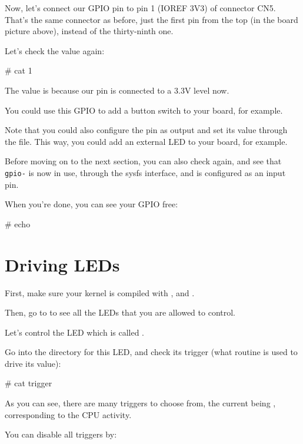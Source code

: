 {Now, let's connect our GPIO pin to pin 1 (IOREF 3V3) of connector CN5.
That's the same connector as before, just the first pin from the top
(in the board picture above), instead of the thirty-ninth one.

Let's check the value again:

\begin{bashinput}
# cat %
1
\end{bashinput}

The value is  because our pin is connected to a 3.3V level now.

You could use this GPIO to add a button switch to your board, for
example.

Note that you could also configure the pin as output and set its value
through the  file. This way, you could add an external LED
to your board, for example.

Before moving on to the next section, you can also check
 again, and see that {\tt gpio-\gpionum} is now
in use, through the sysfs interface, and is configured as an input pin.

When you're done, you can see your GPIO free:

\begin{bashinput}
# echo %
\end{bashinput}

\section{Driving LEDs}

First, make sure your kernel is compiled with
, 
and .

Then, go to  to see all the LEDs that you are allowed
to control.

Let's control the LED which is called
.

Go into the directory for this LED, and check its trigger (what
routine is used to drive its value):

\begin{bashinput}
# cat trigger
\end{bashinput}

As you can see, there are many triggers to choose from, the current
being , corresponding to the CPU activity.

You can disable all triggers by:

}
